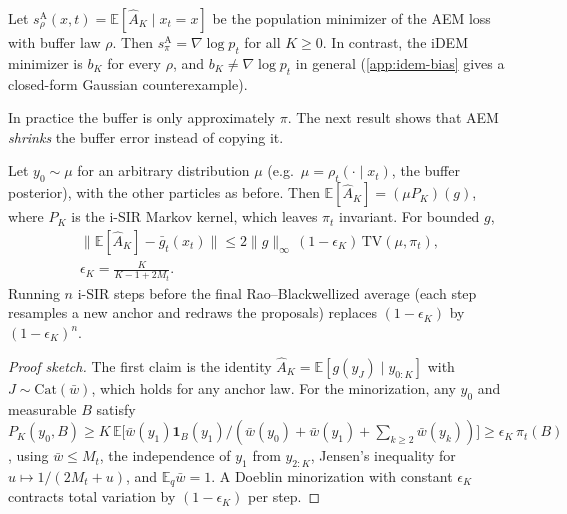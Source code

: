 \begin{corollary}
\label{cor:fixed}
Let $s^{\mathrm{A}}_\rho(x,t)=\mathbb{E}[\widehat A_K\mid x_t=x]$ be the population minimizer of the AEM loss with buffer law $\rho$.
Then $s^{\mathrm{A}}_\pi=\nabla\log p_t$ for all $K\ge0$.
In contrast, the iDEM minimizer is $b_K$ for every $\rho$, and $b_K\neq\nabla\log p_t$ in general (\cref{app:idem-bias} gives a closed-form Gaussian counterexample).
\end{corollary}

In practice the buffer is only approximately $\pi$. The next result shows that AEM \emph{shrinks} the buffer error instead of copying it.

\begin{theorem}
\label{thm:contraction}
Let $y_0\sim\mu$ for an arbitrary distribution $\mu$ (e.g.\ $\mu=\rho_t(\cdot\mid x_t)$, the buffer posterior), with the other particles as before.
Then $\mathbb{E}[\widehat A_K]=(\mu P_K)(g)$, where $P_K$ is the i-SIR Markov kernel, which leaves $\pi_t$ invariant. For bounded $g$,
\begin{gather*}
\big\|\mathbb{E}[\widehat A_K]-\bar g_t(x_t)\big\|
\le 2\|g\|_\infty\,(1-\epsilon_K)\,\mathrm{TV}(\mu,\pi_t),\\
\epsilon_K=\frac{K}{K-1+2M_t}.
\end{gather*}
Running $n$ i-SIR steps before the final Rao--Blackwellized average (each step resamples a new anchor and redraws the proposals) replaces $(1-\epsilon_K)$ by $(1-\epsilon_K)^n$.
\end{theorem}
\begin{proof}[Proof sketch]
The first claim is the identity $\widehat A_K=\mathbb{E}[g(y_J)\mid y_{0:K}]$ with $J\sim\mathrm{Cat}(\bar w)$, which holds for any anchor law.
For the minorization, any $y_0$ and measurable $B$ satisfy
$P_K(y_0,B)\ge K\,\mathbb{E}\big[\bar w(y_1)\mathbf 1_B(y_1)/(\bar w(y_0)+\bar w(y_1)+\sum_{k\ge2}\bar w(y_k))\big]\ge \epsilon_K\,\pi_t(B)$,
using $\bar w\le M_t$, the independence of $y_1$ from $y_{2:K}$, Jensen's inequality for $u\mapsto 1/(2M_t+u)$, and $\mathbb{E}_q\bar w=1$.
A Doeblin minorization with constant $\epsilon_K$ contracts total variation by $(1-\epsilon_K)$ per step.
\end{proof}

